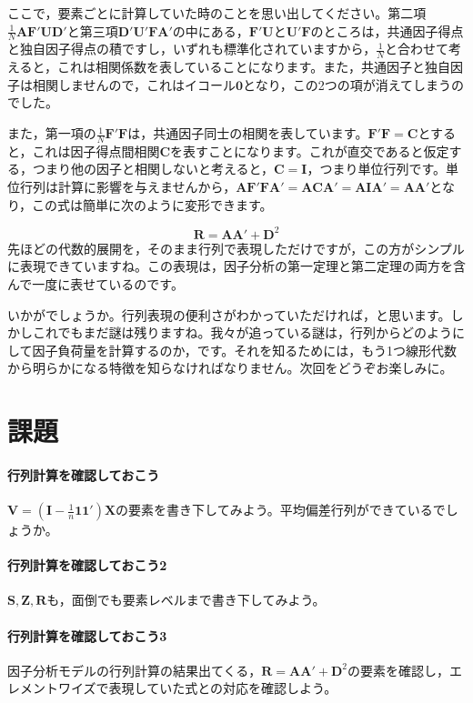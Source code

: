\documentclass{ltjsbook}
\begin{document}
ここで，要素ごとに計算していた時のことを思い出してください。第二項$\frac{1}{N} \bm{A} \bm{F}'\bm{U} \bm{D}'$と第三項$\bm{D}' \bm{U}' \bm{F} \bm{A}'$の中にある，$\bm{F}' \bm{U}$と$\bm{U}' \bm{F}$のところは，共通因子得点と独自因子得点の積ですし，いずれも標準化されていますから，$\frac{1}{N}$と合わせて考えると，これは相関係数を表していることになります。また，共通因子と独自因子は相関しませんので，これはイコール$\bm{0}$となり，この2つの項が消えてしまうのでした。

また，第一項の$\frac{1}{N}\bm{F} ' \bm{F}$は，共通因子同士の相関を表しています。$\bm{F'F}=\bm{C}$とすると，これは因子得点間相関$\bm{C}$を表すことになります。これが直交であると仮定する，つまり他の因子と相関しないと考えると，$\bm{C} = \bm{I}$，つまり単位行列です。単位行列は計算に影響を与えませんから，$\bm{AF'FA'}=\bm{ACA'}=\bm{AIA'}=\bm{AA'}$となり，この式は簡単に次のように変形できます。

\begin{equation}
	\bm{R} = \bm{A} \bm{A} ' + \bm{D}^2
\end{equation}
先ほどの代数的展開を，そのまま行列で表現しただけですが，この方がシンプルに表現できていますね。この表現は，因子分析の第一定理と第二定理の両方を含んで一度に表せているのです。

いかがでしょうか。行列表現の便利さがわかっていただければ，と思います。しかしこれでもまだ謎は残りますね。我々が追っている謎は，行列からどのようにして因子負荷量を計算するのか，です。それを知るためには，もう1つ線形代数から明らかになる特徴を知らなければなりません。次回をどうぞお楽しみに。
\section{課題}
\paragraph{行列計算を確認しておこう}$ \bm{V} = ( \bm{I} -\frac{1}{n}\bm{1} \bm{1} ')\bm{X} $の要素を書き下してみよう。平均偏差行列ができているでしょうか。
\paragraph{行列計算を確認しておこう2}$ \bm{S},\bm{Z},\bm{R}$も，面倒でも要素レベルまで書き下してみよう。
\paragraph{行列計算を確認しておこう3}因子分析モデルの行列計算の結果出てくる，$\bm{R} = \bm{A} \bm{A} ' + \bm{D}^2$の要素を確認し，エレメントワイズで表現していた式との対応を確認しよう。
\end{document}
